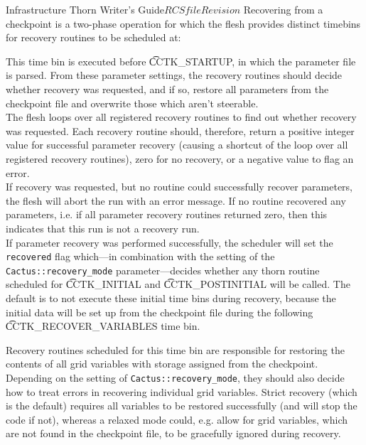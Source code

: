 \begin{cactuspart}{Infrastructure Thorn Writer's Guide}{$RCSfile$}{$Revision$}
Recovering from a checkpoint is a two-phase operation for which the flesh
provides distinct timebins for recovery routines to be scheduled at:
%
\begin{Lentry}
  \item[{\t CCTK\_RECOVER\_PARAMETERS}] This time bin is executed before
    {\t CCTK\_STARTUP}, in which the parameter file is parsed. From these parameter
    settings, the recovery routines should decide whether recovery was
    requested, and if so, restore all parameters from the checkpoint file and
    overwrite those which aren't steerable.\\
    The flesh loops over all registered recovery routines to find out
    whether recovery was requested. Each recovery routine should, therefore,
    return a positive integer value for successful parameter recovery (causing
    a shortcut of the loop over all registered recovery routines),
    zero for no recovery, or a negative value to flag an error.\\
    If recovery was requested, but no routine could successfully recover
    parameters, the flesh will abort the run with an error message.
    If no routine recovered any parameters, i.e. if all parameter
    recovery routines returned zero, then this indicates that this run
    is not a recovery run.\\
    If parameter recovery was performed successfully, the scheduler will set the
    {\tt recovered} flag which---in combination with the setting of the {\tt
    Cactus::recovery\_mode} parameter---decides whether any thorn routine
    scheduled for {\t CCTK\_INITIAL} and {\t CCTK\_POSTINITIAL} will be called.
    The default is to not execute these initial time bins during recovery, 
    because the initial data will be set up from the checkpoint file during the
    following {\t CCTK\_RECOVER\_VARIABLES} time bin.
  \item[{\t CCTK\_RECOVER\_VARIABLES}]
    Recovery routines scheduled for this time bin are responsible for restoring
    the contents of all grid variables with storage assigned from the
    checkpoint.\\
    Depending on the setting of {\tt Cactus::recovery\_mode}, they should also
    decide how to treat errors in recovering individual grid variables. Strict
    recovery (which is the default) requires all variables to be restored
    successfully (and will stop the code if not), whereas a relaxed mode
    could, e.g. allow for grid variables, which are not found in the checkpoint
    file, to be gracefully ignored during recovery.
\end{Lentry}



\end{cactuspart}
